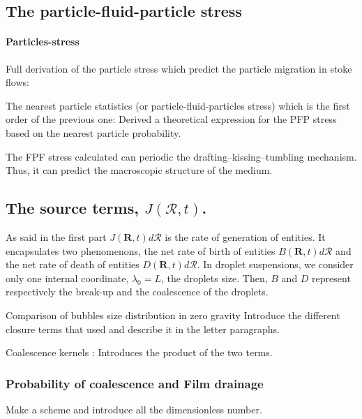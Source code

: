 \subsection{The particle-fluid-particle stress}
\paragraph*{Particles-stress}

Full derivation of the particle stress which predict the particle migration in stoke flows:
\citet{nott2011suspension}

The nearest particle statistics (or particle-fluid-particles stress) which is the first order of the previous one:
\citet{zhang2021ensemble}
Derived a theoretical expression for the PFP stress based on the nearest particle probability. 

\citet{wang2021numerical}
The FPF stress calculated can periodic the drafting–kissing–tumbling mechanism. 
Thus, it can predict the macroscopic structure of the medium. 

 







\subsection{The source terms, $J(\mathcal{R},t)$.}
As said in the first part $J(\mathcal{\bm{R}},t)d\mathcal{R}$ is the rate of generation of entities. 
It encapsulates two phenomenons, the net rate of birth of entities $B(\mathcal{\bm{R}},t)d\mathcal{R}$ and the net rate of death of entities $D(\mathcal{\bm{R}},t)d\mathcal{R}$.
In droplet suspensions, we consider only one internal coordinate, $\lambda_0 = L$, the droplets size.
Then, $B$ and $D$ represent respectively the break-up and the coalescence of the droplets. 

Comparison of bubbles size distribution in zero gravity \citet{KAMP20011363}
Introduce the different closure terms that \citet{KAMP20011363} used and describe it in the letter paragraphs.

Coalescence kernels : \citet{morel2010comparison}
Introduces the product of the two terms.
\subsubsection{Probability of coalescence and Film drainage}
Make a scheme and introduce all the dimensionless number. 


